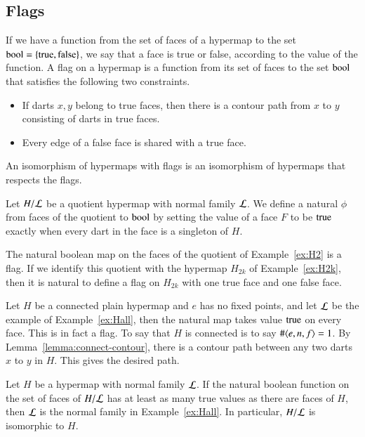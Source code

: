 \subsection{Flags}

\begin{definition}  If we have a function from the set of faces of a hypermap
to the set ${\operatorname{bool}}=\{{\operatorname{true}},{\operatorname{false}}\}$, we say that a face is true or
false, according to the value of the function.  A flag on a hypermap
is a function from its set of faces to the set
${\operatorname{bool}}$ that satisfies the following two
constraints.
\begin{itemize}
    \item If darts $x,y$ belong to true faces,
    then there is a contour path from $x$ to $y$ consisting of darts
    in true faces.
    \item Every edge of a false face is shared with a true face.
    \end{itemize}
An isomorphism of hypermaps with flags is an isomorphism of
hypermaps that respects the flags.
\end{definition}

\begin{example} Let $H/{\cal L}$ be a quotient hypermap with
normal family $\cal L$.  We define
a natural $\phi$ from faces of the quotient to ${\operatorname{bool}}$ by setting
the value of a face $F$ to be ${\operatorname{true}}$ exactly when every dart in
the face is a singleton of $H$.
\end{example}

\begin{example} The natural boolean map on the faces of the
quotient of Example~\ref{ex:H2} is a flag.  If we identify this
quotient with the hypermap $H_{2k}$ of Example~\ref{ex:H2k}, 
then it is natural to define a flag
on $H_{2k}$ with one true face and one false face.
\end{example}

\begin{example} Let 
$H$ be a connected plain hypermap and $e$ has no fixed points,
and let $\cal L$ be the example of Example~\ref{ex:Hall}, 
then the natural
map takes value ${\operatorname{true}}$ on every face.  This is in fact a flag.
To say that $H$ is connected is to say $\#\langle e,n,f\rangle=1$. 
By Lemma~\ref{lemma:connect-contour}, there is a contour path between
any two darts $x$ to $y$ in $H$.  This gives the desired path.
\end{example}

\begin{lemma}\label{lemma:all-dart}  
Let $H$ be a hypermap with normal family ${\cal L}$.
If the natural boolean function on the set of faces of
$H/{\cal L}$ has at least as many
true values as there are faces of $H$, then $\cal L$ is the normal family
in Example~\ref{ex:Hall}. In particular, $H/{\cal L}$ is isomorphic to $H$.
\end{lemma}

